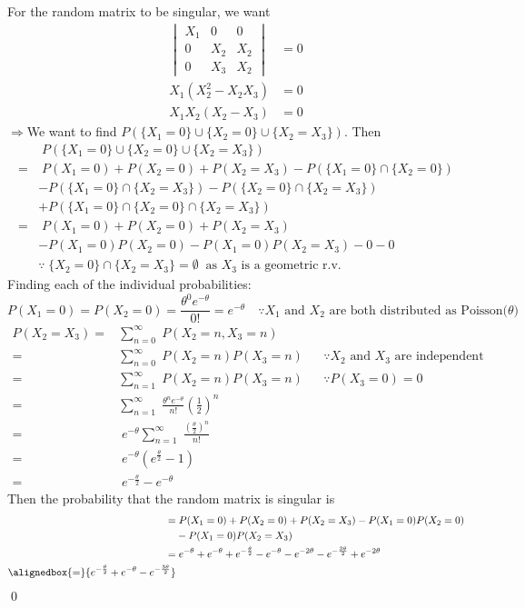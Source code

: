 \documentclass{mthe353answer}
\begin{document}
\begin{questions}
  \setcounter{question}{3}
  \question{}
  For the random matrix to be singular, we want
  \begin{align*}
    \begin{vmatrix}
      X_1 & 0 & 0\\
      0&X_2&X_2\\
      0&X_3&X_2
    \end{vmatrix} &= 0\\
    X_1(X_2^2-X_2X_3) &= 0\\
    X_1X_2(X_2-X_3) &= 0
  \end{align*}
  \(\Rightarrow\)We want to find \(P(\{X_1=0\}\cup\{X_2=0\}\cup\{X_2=X_3\})\). Then
  \begin{align*}
      &\; P(\{X_1=0\}\cup\{X_2=0\}\cup\{X_2=X_3\})\\
     =&\; P(X_1=0)+P(X_2=0)+P(X_2=X_3)-P(\{X_1=0\}\cap\{X_2=0\})\\
      &-P(\{X_1=0\}\cap\{X_2=X_3\})-P(\{X_2=0\}\cap\{X_2=X_3\})\\
      &+P(\{X_1=0\}\cap\{X_2=0\}\cap\{X_2=X_3\})\\
     =&\; P(X_1=0)+P(X_2=0)+P(X_2=X_3)\\
      &-P(X_1=0)P(X_2=0)-P(X_1=0)P(X_2=X_3)-0-0\\
      & \because\; \{X_2=0\}\cap\{X_2=X_3\}=\emptyset\ \text{ as \(X_3\) is a geometric r.v.}
  \end{align*}
  Finding each of the individual probabilities:
  \begin{displaymath}
    P(X_1=0)=P(X_2=0)=\frac{\theta^0e^{-\theta}}{0!}=e^{-\theta}\quad \because X_1 \text{ and } X_2 \text{ are both distributed as Poisson(\(\theta\))}
  \end{displaymath}
  \begin{align*}
    P(X_2=X_3) =& \sum_{n=0}^{\infty}\; P(X_2=n,X_3=n)\\
    =& \sum_{n=0}^{\infty}\; P(X_2=n)P(X_3=n) && \because X_2 \text{ and } X_3 \text{ are independent}\\
    =& \sum_{n=1}^{\infty}\; P(X_2=n)P(X_3=n) && \because P(X_3=0)=0\\
    =& \sum_{n=1}^{\infty}\; \frac{\theta^n{}e^{-\theta}}{n!}\left(\frac{1}{2}\right)^n\\
    =&\; e^{-\theta} \sum_{n=1}^{\infty}\; \frac{\left(\frac{\theta}{2}\right)^n}{n!}\\
    =&\; e^{-\theta}\left(e^{\frac{\theta}{2}}-1\right)\\
    =&\; e^{-\frac{\theta}{2}}-e^{-\theta}
  \end{align*}
  Then the probability that the random matrix is singular is
  \begin{align*}
    =& \; P(X_1=0)+P(X_2=0)+P(X_2=X_3)-P(X_1=0)P(X_2=0)\\
     &-P(X_1=0)P(X_2=X_3)\\
    =& \; e^{-\theta}+e^{-\theta}+e^{-\frac{\theta}{2}}-e^{-\theta}-e^{-2\theta}-e^{-\frac{3\theta}{2}}+e^{-2\theta}\\
    \alignedbox{=}{e^{-\frac{\theta}{2}}+e^{-\theta}-e^{-\frac{3\theta}{2}}}
  \end{align*}
  \hfill\qed{}
\end{questions}
\end{document}

